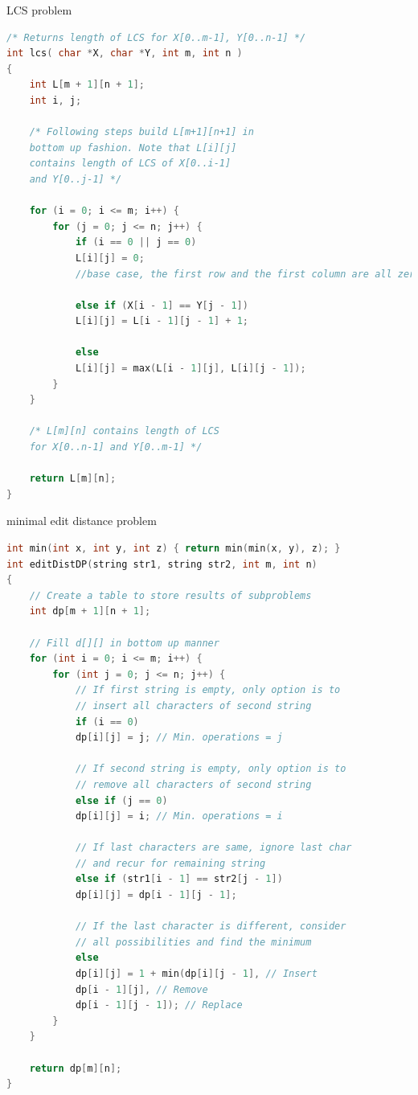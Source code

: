 \documentclass[a4paper,11pt,twoside]{book}
\begin{document}
	
	\par LCS problem 
\begin{lstlisting}[frame=single, language=c++]
/* Returns length of LCS for X[0..m-1], Y[0..n-1] */
int lcs( char *X, char *Y, int m, int n ) 
{ 
	int L[m + 1][n + 1]; 
	int i, j; 
	
	/* Following steps build L[m+1][n+1] in 
	bottom up fashion. Note that L[i][j] 
	contains length of LCS of X[0..i-1]
	and Y[0..j-1] */
	
	for (i = 0; i <= m; i++) { 
		for (j = 0; j <= n; j++) { 
			if (i == 0 || j == 0)  
			L[i][j] = 0;   
			//base case, the first row and the first column are all zero
			
			else if (X[i - 1] == Y[j - 1]) 
			L[i][j] = L[i - 1][j - 1] + 1; 
			
			else
			L[i][j] = max(L[i - 1][j], L[i][j - 1]); 
		} 
	} 
	
	/* L[m][n] contains length of LCS 
	for X[0..n-1] and Y[0..m-1] */
	
	return L[m][n]; 
} 		
\end{lstlisting}	
	
	\par minimal edit distance problem 
\begin{lstlisting}[frame=single, language=c++]
int min(int x, int y, int z) { return min(min(x, y), z); }
int editDistDP(string str1, string str2, int m, int n)
{
	// Create a table to store results of subproblems
	int dp[m + 1][n + 1];
	
	// Fill d[][] in bottom up manner
	for (int i = 0; i <= m; i++) {
		for (int j = 0; j <= n; j++) {
			// If first string is empty, only option is to
			// insert all characters of second string
			if (i == 0)
			dp[i][j] = j; // Min. operations = j
			
			// If second string is empty, only option is to
			// remove all characters of second string
			else if (j == 0)
			dp[i][j] = i; // Min. operations = i
			
			// If last characters are same, ignore last char
			// and recur for remaining string
			else if (str1[i - 1] == str2[j - 1])
			dp[i][j] = dp[i - 1][j - 1];
			
			// If the last character is different, consider
			// all possibilities and find the minimum
			else
			dp[i][j] = 1 + min(dp[i][j - 1], // Insert
			dp[i - 1][j], // Remove
			dp[i - 1][j - 1]); // Replace
		}
	}
	
	return dp[m][n];
}		
\end{lstlisting}	
	
\end{document}
